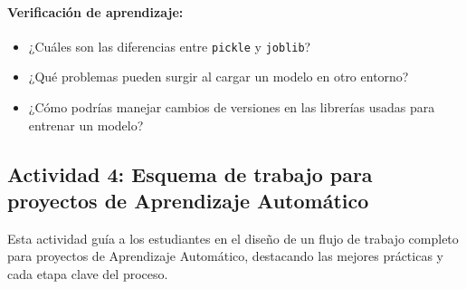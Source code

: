 \documentclass[a4,11pt]{aleph-notas}
\begin{document}
\paragraph{Verificación de aprendizaje:}  
\begin{itemize}[leftmargin=*]
    \item ¿Cuáles son las diferencias entre \texttt{pickle} y \texttt{joblib}?
    \item ¿Qué problemas pueden surgir al cargar un modelo en otro entorno?
    \item ¿Cómo podrías manejar cambios de versiones en las librerías usadas para entrenar un modelo?
\end{itemize}

\subsection*{Actividad 4: Esquema de trabajo para proyectos de Aprendizaje Automático}


Esta actividad guía a los estudiantes en el diseño de un flujo de trabajo completo para proyectos de Aprendizaje Automático, destacando las mejores prácticas y cada etapa clave del proceso.
\end{document}
